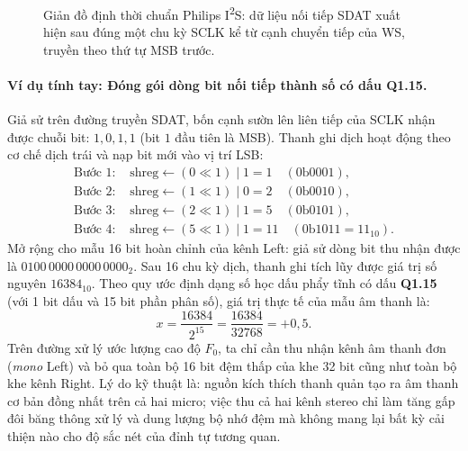 \begin{figure}[H]
\centering
{}
\caption{Giản đồ định thời chuẩn Philips I\textsuperscript{2}S: dữ liệu nối tiếp SDAT xuất hiện sau đúng một chu kỳ SCLK kể từ cạnh chuyển tiếp của WS, truyền theo thứ tự MSB trước.}
\label{fig:ch02_i2s_timing}
\end{figure}

\paragraph{Ví dụ tính tay: Đóng gói dòng bit nối tiếp thành số có dấu Q1.15.}
Giả sử trên đường truyền SDAT, bốn cạnh sườn lên liên tiếp của SCLK nhận được chuỗi bit: $1, 0, 1, 1$ (bit $1$ đầu tiên là MSB). Thanh ghi dịch hoạt động theo cơ chế dịch trái và nạp bit mới vào vị trí LSB:
\begin{align}
\text{Bước 1: } & \text{shreg} \leftarrow (0 \ll 1) \mid 1 = 1 \quad (0\mathrm{b}0001),\\
\text{Bước 2: } & \text{shreg} \leftarrow (1 \ll 1) \mid 0 = 2 \quad (0\mathrm{b}0010),\\
\text{Bước 3: } & \text{shreg} \leftarrow (2 \ll 1) \mid 1 = 5 \quad (0\mathrm{b}0101),\\
\text{Bước 4: } & \text{shreg} \leftarrow (5 \ll 1) \mid 1 = 11 \quad (0\mathrm{b}1011 = 11_{10}).
\end{align}
Mở rộng cho mẫu 16 bit hoàn chỉnh của kênh Left: giả sử dòng bit thu nhận được là $0100\,0000\,0000\,0000_2$. Sau 16 chu kỳ dịch, thanh ghi tích lũy được giá trị số nguyên $16384_{10}$. Theo quy ước định dạng số học dấu phẩy tĩnh có dấu \textbf{Q1.15} (với 1 bit dấu và 15 bit phần phân số), giá trị thực tế của mẫu âm thanh là:
\begin{equation}
x = \frac{16384}{2^{15}} = \frac{16384}{32768} = +0{,}5.
\end{equation}
Trên đường xử lý ước lượng cao độ $F_0$, ta chỉ cần thu nhận kênh âm thanh đơn (\emph{mono} Left) và bỏ qua toàn bộ 16 bit đệm thấp của khe 32 bit cũng như toàn bộ khe kênh Right. Lý do kỹ thuật là: nguồn kích thích thanh quản tạo ra âm thanh cơ bản đồng nhất trên cả hai micro; việc thu cả hai kênh stereo chỉ làm tăng gấp đôi băng thông xử lý và dung lượng bộ nhớ đệm mà không mang lại bất kỳ cải thiện nào cho độ sắc nét của đỉnh tự tương quan.

